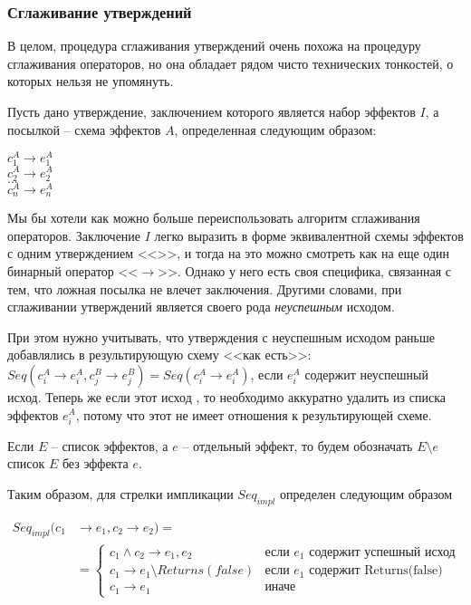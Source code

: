 \subsubsection{Сглаживание утверждений}

В целом, процедура сглаживания утверждений очень похожа на процедуру сглаживания операторов, но она обладает рядом чисто технических тонкостей, о которых нельзя не упомянуть.

Пусть дано утверждение, заключением которого является набор эффектов $I$, а посылкой -- схема эффектов $A$, определенная следующим образом:

{
	$c^A_1 \rightarrow e^A_1$ \\
	$c^A_2 \rightarrow e^A_2$ \\
	$\ldots$ \\
	$c^A_n \rightarrow e^A_n$ \\
}{}

Мы бы хотели как можно больше переиспользовать алгоритм сглаживания операторов. Заключение $I$ легко выразить в форме эквивалентной схемы эффектов с одним утверждением <<>>, и тогда на это можно смотреть как на еще один бинарный оператор <<$\rightarrow$>>. Однако у него есть своя специфика, связанная с тем, что ложная посылка не влечет заключения. Другими словами, при сглаживании утверждений  является своего рода \emph{неуспешным} исходом. 

При этом нужно учитывать, что утверждения с неуспешным исходом раньше добавлялись в результирующую схему <<как есть>>: $Seq(c^A_i \rightarrow e^A_i, c^B_j \rightarrow e^B_j) = Seq(c^A_i \rightarrow e^A_i)$, если $e^A_i$ содержит неуспешный исход. Теперь же если этот исход , то необходимо аккуратно удалить  из списка эффектов $e^A_i$, потому что этот  не имеет отношения к результирующей схеме. 

Если $E$ -- список эффектов, а $e$ -- отдельный эффект, то будем обозначать $E \setminus e$ список $E$ без эффекта $e$.

Таким образом, для стрелки импликации $Seq_{impl}$ определен следующим образом

\[
\begin{split}
    Seq_{impl}(c_1 & \rightarrow e_1, c_2 \rightarrow e_2) = \\
    & = \begin{cases}
        c_1 \land c_2 \rightarrow e_1, e_2 & \text{если } e_1 \text{ содержит успешный исход} \\
        c_1 \rightarrow e_1 \setminus Returns(false) & \text{если } e_1 \text{ содержит Returns(false)} \\
        c_1 \rightarrow e_1							 & \text{иначе}
    \end{cases}
\end{split}
\]



